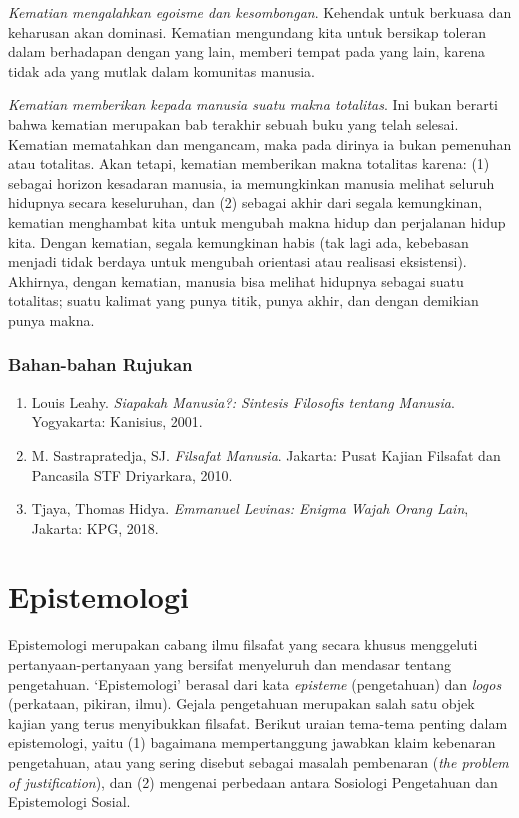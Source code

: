 \documentclass[10pt,a4paper]{article}
\def\tightlist{}
\begin{document}
\begin{multicols}{2}
\emph{Kematian mengalahkan egoisme dan kesombongan}. Kehendak untuk
berkuasa dan keharusan akan dominasi. Kematian mengundang kita untuk
bersikap toleran dalam berhadapan dengan yang lain, memberi tempat pada
yang lain, karena tidak ada yang mutlak dalam komunitas manusia.

\emph{Kematian memberikan kepada manusia suatu makna totalitas}. Ini
bukan berarti bahwa kematian merupakan bab terakhir sebuah buku yang
telah selesai. Kematian mematahkan dan mengancam, maka pada dirinya ia
bukan pemenuhan atau totalitas. Akan tetapi, kematian memberikan makna
totalitas karena: (1) sebagai horizon kesadaran manusia, ia memungkinkan
manusia melihat seluruh hidupnya secara keseluruhan, dan (2) sebagai
akhir dari segala kemungkinan, kematian menghambat kita untuk mengubah
makna hidup dan perjalanan hidup kita. Dengan kematian, segala
kemungkinan habis (tak lagi ada, kebebasan menjadi tidak berdaya untuk
mengubah orientasi atau realisasi eksistensi). Akhirnya, dengan
kematian, manusia bisa melihat hidupnya sebagai suatu totalitas; suatu
kalimat yang punya titik, punya akhir, dan dengan demikian punya makna.

\hypertarget{bahan-bahan-rujukan}{%
\subsubsection{Bahan-bahan Rujukan}\label{bahan-bahan-rujukan}}

\begin{enumerate}
\def\labelenumi{\arabic{enumi}.}
\tightlist
\item
  Louis Leahy. \emph{Siapakah Manusia?: Sintesis Filosofis tentang
  Manusia}. Yogyakarta: Kanisius, 2001.
\item
  M. Sastrapratedja, SJ. \emph{Filsafat Manusia}. Jakarta: Pusat Kajian
  Filsafat dan Pancasila STF Driyarkara, 2010.
\item
  Tjaya, Thomas Hidya. \emph{Emmanuel Levinas: Enigma Wajah Orang Lain},
  Jakarta: KPG, 2018.
\end{enumerate}

\hypertarget{epistemologi}{%
\section{Epistemologi}\label{epistemologi}}

Epistemologi merupakan cabang ilmu filsafat yang secara khusus
menggeluti pertanyaan-pertanyaan yang bersifat menyeluruh dan mendasar
tentang pengetahuan. `Epistemologi' berasal dari kata \emph{episteme}
(pengetahuan) dan \emph{logos} (perkataan, pikiran, ilmu). Gejala
pengetahuan merupakan salah satu objek kajian yang terus menyibukkan
filsafat. Berikut uraian tema-tema penting dalam epistemologi, yaitu (1)
bagaimana mempertanggung jawabkan klaim kebenaran pengetahuan, atau yang
sering disebut sebagai masalah pembenaran (\emph{the problem of
justification}), dan (2) mengenai perbedaan antara Sosiologi Pengetahuan
dan Epistemologi Sosial.


\end{multicols}
\end{document}
